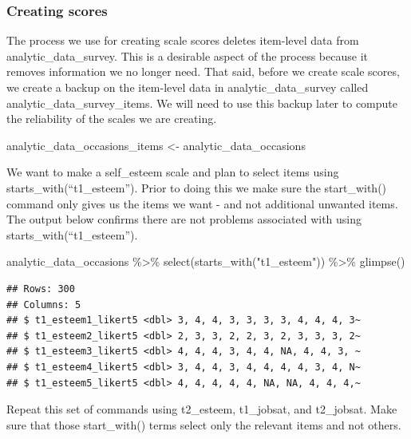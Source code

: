 \documentclass[
]{krantz}
\makeatletter
\newenvironment{Shaded}{\begin{snugshade}}{\end{snugshade}}
\newcommand{\FunctionTok}[1]{\textcolor[rgb]{0,0,0}{#1}}
\newcommand{\NormalTok}[1]{#1}
\newcommand{\OtherTok}[1]{\textcolor[rgb]{0.37,0.37,0.37}{#1}}
\newcommand{\SpecialCharTok}[1]{\textcolor[rgb]{0,0,0}{#1}}
\newcommand{\StringTok}[1]{\textcolor[rgb]{0.5,0.5,0.5}{#1}}
\newenvironment{kframe}{%
\medskip{}
\setlength{\fboxsep}{.8em}
 \def\at@end@of@kframe{}%
 \ifinner\ifhmode%
  \def\at@end@of@kframe{\end{minipage}}%
  \begin{minipage}{\columnwidth}%
 \fi\fi%
 \def\FrameCommand##1{\hskip\@totalleftmargin \hskip-\fboxsep
 \colorbox{shadecolor}{##1}\hskip-\fboxsep
     \hskip-\linewidth \hskip-\@totalleftmargin \hskip\columnwidth}%
 \MakeFramed {\advance\hsize-\width
   \@totalleftmargin\z@ \linewidth\hsize
   \@setminipage}}%
 {\par\unskip\endMakeFramed%
 \at@end@of@kframe}
\renewenvironment{Shaded}{\begin{kframe}}{\end{kframe}}
\makeatother
\begin{document}
\hypertarget{creating-scores-3}{%
\subsubsection{Creating scores}\label{creating-scores-3}}

The process we use for creating scale scores deletes item-level data from analytic\_data\_survey. This is a desirable aspect of the process because it removes information we no longer need. That said, before we create scale scores, we create a backup on the item-level data in analytic\_data\_survey called analytic\_data\_survey\_items. We will need to use this backup later to compute the reliability of the scales we are creating.

\begin{Shaded}
\begin{Highlighting}[]
\NormalTok{analytic\_data\_occasions\_items }\OtherTok{\textless{}{-}}\NormalTok{ analytic\_data\_occasions}
\end{Highlighting}
\end{Shaded}

We want to make a self\_esteem scale and plan to select items using starts\_with(``t1\_esteem''). Prior to doing this we make sure the start\_with() command only gives us the items we want - and not additional unwanted items. The output below confirms there are not problems associated with using starts\_with(``t1\_esteem'').

\begin{Shaded}
\begin{Highlighting}[]
\NormalTok{analytic\_data\_occasions }\SpecialCharTok{\%\textgreater{}\%}
  \FunctionTok{select}\NormalTok{(}\FunctionTok{starts\_with}\NormalTok{(}\StringTok{"t1\_esteem"}\NormalTok{)) }\SpecialCharTok{\%\textgreater{}\%}
  \FunctionTok{glimpse}\NormalTok{()}
\end{Highlighting}
\end{Shaded}

\begin{verbatim}
## Rows: 300
## Columns: 5
## $ t1_esteem1_likert5 <dbl> 3, 4, 4, 3, 3, 3, 3, 4, 4, 4, 3~
## $ t1_esteem2_likert5 <dbl> 2, 3, 3, 2, 2, 3, 2, 3, 3, 3, 2~
## $ t1_esteem3_likert5 <dbl> 4, 4, 4, 3, 4, 4, NA, 4, 4, 3, ~
## $ t1_esteem4_likert5 <dbl> 3, 4, 4, 3, 4, 4, 4, 4, 3, 4, N~
## $ t1_esteem5_likert5 <dbl> 4, 4, 4, 4, 4, NA, NA, 4, 4, 4,~
\end{verbatim}

Repeat this set of commands using t2\_esteem, t1\_jobsat, and t2\_jobsat. Make sure that those start\_with() terms select only the relevant items and not others.
\end{document}
